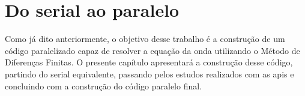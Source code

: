 \chapter{Do serial ao paralelo}

	\label{cap:implementation}
	
	Como já dito anteriormente, o objetivo desse trabalho é a construção 
	de um código paralelizado capaz de resolver a equação da onda utilizando
	o Método de Diferenças Finitas. O presente capítulo apresentará a 
	construção desse código, partindo do serial equivalente, passando pelos 
	estudos realizados com as \glspl{api} e concluindo com a construção do 
	código paralelo final.

    
    
    
    
    
        
    